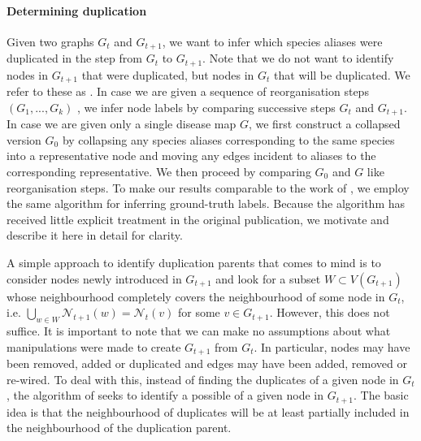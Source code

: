 \documentclass[
	fontsize=10pt, %
	twoside=true, %
	secnumdepth=1, %
  toc=indentunnumbered %
]{kaobook}
\begin{document}
\paragraph{Determining duplication} Given two graphs $G_t$ and $G_{t+1}$, we
want to infer which species aliases were duplicated in the step from $G_t$ to
$G_{t+1}$. Note that we do not want to identify nodes in $G_{t+1}$ that were
duplicated, but nodes in $G_t$ that will be duplicated. We refer to these as
. In case we are given a sequence of reorganisation
steps $(G_1, ..., G_k)$ , we infer node labels by comparing successive steps
$G_t$ and $G_{t+1}$. In
case we are given only a single disease map $G$, we first construct a collapsed
version $G_0$ by collapsing any species aliases
corresponding to the same species into a representative node and moving any edges
incident to aliases to the corresponding representative. We then proceed by
comparing $G_0$ and $G$ like reorganisation steps.
%
To make our results comparable to the work of
\citeauthor{nielsen_MachineLearningSupport_2019}
\cite{nielsen_MachineLearningSupport_2019}, we employ the same algorithm for
inferring ground-truth labels. Because the algorithm has received little
explicit treatment in the original publication, we motivate and describe it here
in detail for clarity.
%

A simple approach to identify duplication parents that comes to mind is to
consider nodes newly introduced in $G_{t+1}$ and look for a subset $W \subset
V(G_{t+1})$ whose neighbourhood completely covers the neighbourhood of some node
in $G_{t}$, i.e. $\bigcup_{w \in W} \mathcal{N}_{t+1}(w) = \mathcal{N}_t(v)$ for
some $v \in G_{t+1}$. However, this does not suffice. It is important to note
that we can make no assumptions about what manipulations were made to create
$G_{t+1}$ from $G_t$. In particular, nodes may have been removed, added or
duplicated and edges may have been added, removed or re-wired.
%
To deal with this, instead of finding the duplicates of a given node in
$G_{t}$, the algorithm of \nielsen{} seeks to identify a possible  of
a given node in $G_{t+1}$. The basic idea is that the neighbourhood of
duplicates will be at least partially included in the neighbourhood of the
duplication parent.
\end{document}
